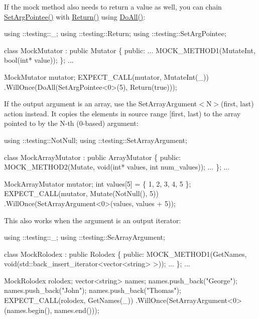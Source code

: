 If the mock method also needs to return a value as well, you can chain {\ttfamily \hyperlink{namespacetesting_a5740a5033b88c37666fcd09a269d123f}{Set\+Arg\+Pointee()}} with {\ttfamily \hyperlink{namespacetesting_af6d1c13e9376c77671e37545cd84359c}{Return()}} using {\ttfamily \hyperlink{namespacetesting_a5f533932753d2af95000e96c4a3042e3}{Do\+All()}}\+:


\begin{DoxyCode}
using ::testing::\_;
using ::testing::Return;
using ::testing::SetArgPointee;

class MockMutator : public Mutator \{
 public:
  ...
  MOCK\_METHOD1(MutateInt, bool(int* value));
\};
...

  MockMutator mutator;
  EXPECT\_CALL(mutator, MutateInt(\_))
      .WillOnce(DoAll(SetArgPointee<0>(5),
                      Return(true)));
\end{DoxyCode}


If the output argument is an array, use the {\ttfamily Set\+Array\+Argument$<$N$>$(first, last)} action instead. It copies the elements in source range {\ttfamily \mbox{[}first, last)} to the array pointed to by the {\ttfamily N}-\/th (0-\/based) argument\+:


\begin{DoxyCode}
using ::testing::NotNull;
using ::testing::SetArrayArgument;

class MockArrayMutator : public ArrayMutator \{
 public:
  MOCK\_METHOD2(Mutate, void(int* values, int num\_values));
  ...
\};
...

  MockArrayMutator mutator;
  int values[5] = \{ 1, 2, 3, 4, 5 \};
  EXPECT\_CALL(mutator, Mutate(NotNull(), 5))
      .WillOnce(SetArrayArgument<0>(values, values + 5));
\end{DoxyCode}


This also works when the argument is an output iterator\+:


\begin{DoxyCode}
using ::testing::\_;
using ::testing::SeArrayArgument;

class MockRolodex : public Rolodex \{
 public:
  MOCK\_METHOD1(GetNames, void(std::back\_insert\_iterator<vector<string> >));
  ...
\};
...

  MockRolodex rolodex;
  vector<string> names;
  names.push\_back("George");
  names.push\_back("John");
  names.push\_back("Thomas");
  EXPECT\_CALL(rolodex, GetNames(\_))
      .WillOnce(SetArrayArgument<0>(names.begin(), names.end()));
\end{DoxyCode}


